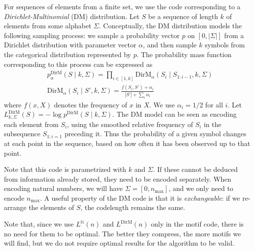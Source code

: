 \documentclass[twoside,11pt]{article}
\newcommand{\N}{{\mathbb N}}
\begin{document}
For sequences of elements from a finite set, we use the code corresponding to a \emph{Dirichlet-Multinomial} (DM) distribution. Let $S$ be a sequence of length $k$ of elements from some alphabet $\Sigma$. Conceptually, the DM distribution models the following sampling process: we sample a probability vector $p$ on $[0, |\Sigma|]$ from a Dirichlet distribution with parameter vector $\alpha$, and then sample $k$ symbols from the categorical distribution represented by $p$. The probability mass function corresponding to this process can be expressed as
\begin{align*}
&p^\text{DirM}_\alpha(S\mid k, \Sigma) = \prod_{i \in [1,k]} \text{DirM}_\alpha(S_i\mid S_{1:i-1}, k, \Sigma) \\
&\text{DirM}_\alpha(S_i \mid S', k, \Sigma) = \frac{f(S_i, S') + \alpha_i}{|S'| + \sum_i \alpha_i}
\end{align*}
where $f(x, X)$ denotes the frequency of $x$ in $X$. We use $\alpha_i = 1/2$ for all $i$. Let $L^\text{DirM}_{k,\Sigma} (S) = -\log p^\text{DirM}(S \mid k, \Sigma)$. The DM model can be seen as encoding each element from $S_i$, using the smoothed relative frequency of $S_i$ in the subsequence $S_{1:i=1}$ preceding it. Thus the probability of a given symbol changes at each point in the sequence, based on how often it has been observed up to that point.

Note that this code is parametrized with $k$ and $\Sigma$. If these cannot be deduced from information already stored, they need to be encoded separately. When encoding natural numbers, we will have $\Sigma = [0, n_\text{max}]$, and we only need to encode $n_\text{max}$. A useful property of the DM code is that it is \emph{exchangeable}: if we re-arrange the elements of $S$, the codelength remains the same. 

Note that, since we use $L^\N(n)$ and $L^\text{DirM}(n)$ only in the motif code, there is no need for them to be optimal. The better they compress, the more motifs we will find, but we do not require optimal results for the algorithm to be valid. 
\end{document}
